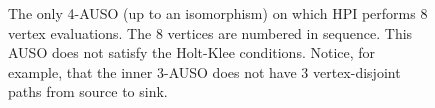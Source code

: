 \begin{figure}[H]
{\begin{tikzpicture}[scale=2.5]
 \end{tikzpicture}
 }
 \caption{The only 4-AUSO (up to an isomorphism) on which HPI performs $8$ vertex evaluations. The $8$ vertices are numbered in sequence. This AUSO does not satisfy the Holt-Klee conditions. Notice, for example, that the inner $3$-AUSO does not have $3$ vertex-disjoint paths from source to sink.}
 \label{fig:4auso-8hpi}
\end{figure}
